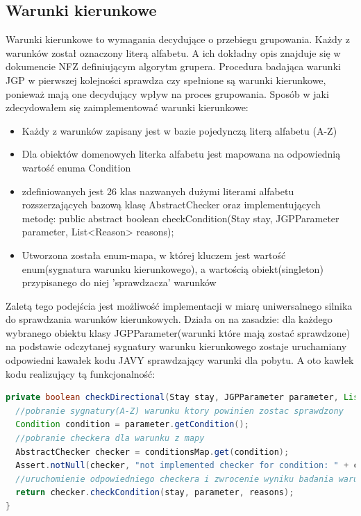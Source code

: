 \subsection{Warunki kierunkowe}
\label{sec:warunkiKierunkowe}
Warunki kierunkowe to wymagania decydujące o przebiegu grupowania. Każdy z warunków został oznaczony literą alfabetu. A ich  dokładny opis znajduje się w dokumencie NFZ definiującym algorytm grupera. Procedura badająca warunki JGP w pierwszej kolejności sprawdza czy spełnione są warunki kierunkowe, ponieważ mają one decydujący wpływ na proces grupowania.
Sposób w jaki zdecydowałem się zaimplementować warunki kierunkowe:
\begin{itemize}
\item Każdy z warunków zapisany jest w bazie pojedynczą literą alfabetu (A-Z)
\item Dla obiektów domenowych literka alfabetu jest mapowana na odpowiednią wartość enuma Condition
\item zdefiniowanych jest 26 klas nazwanych dużymi literami alfabetu rozszerzających bazową klasę AbstractChecker oraz implementujących metodę:
  public abstract boolean checkCondition(Stay stay, JGPParameter parameter, List<Reason> reasons);
\item Utworzona została enum-mapa, w której kluczem jest wartość enum(sygnatura warunku kierunkowego), a wartością obiekt(singleton) przypisanego do niej 'sprawdzacza' warunków
\end{itemize}
Zaletą tego podejścia jest możliwość implementacji w miarę uniwersalnego silnika do sprawdzania warunków kierunkowych. Działa on na zasadzie: dla każdego wybranego obiektu klasy \mbox{JGPParameter}(warunki które mają zostać sprawdzone) na podstawie odczytanej sygnatury warunku kierunkowego zostaje uruchamiany odpowiedni kawałek kodu JAVY sprawdzający warunki dla pobytu. A oto kawłek kodu realizujący tą funkcjonalność:

\begin{lstlisting}[language=Java]
private boolean checkDirectional(Stay stay, JGPParameter parameter, List<Reason> reasons) {
  //pobranie sygnatury(A-Z) warunku ktory powinien zostac sprawdzony
  Condition condition = parameter.getCondition();
  //pobranie checkera dla warunku z mapy
  AbstractChecker checker = conditionsMap.get(condition);
  Assert.notNull(checker, "not implemented checker for condition: " + condition);
  //uruchomienie odpowiedniego checkera i zwrocenie wyniku badania warunku
  return checker.checkCondition(stay, parameter, reasons);
}
\end{lstlisting}

